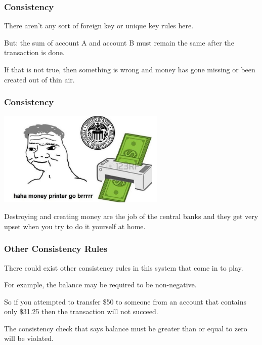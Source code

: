 \begin{frame}
\frametitle{Consistency}
There aren't any sort of foreign key or unique key rules here.

But: the sum of account A and account B must remain the same after the transaction is done. 

If that is not true, then something is wrong and money has gone missing or been created out of thin air. 

\end{frame}

\begin{frame}
\frametitle{Consistency}

\begin{center}
	\includegraphics[width=0.6\textwidth]{images/moneyprinter.jpg}
\end{center}

Destroying and creating money are the job of the central banks and they get very upset when you try to do it yourself at home. 

\end{frame}

\begin{frame}
\frametitle{Other Consistency Rules}

There could exist other consistency rules in this system that come in to play. 

For example, the balance may be required to be non-negative. 

So if you attempted to transfer \$50 to someone from an account that contains only \$31.25 then the transaction will not succeed.

The consistency check that says balance must be greater than or equal to zero will be violated.

\end{frame}

